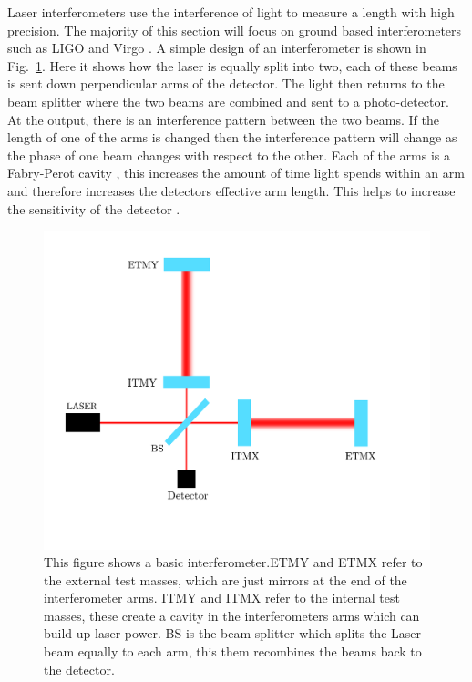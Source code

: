 Laser interferometers use the interference of light to measure a length with high precision.
The majority of this section will focus on ground based interferometers such as \ac{LIGO} and Virgo \citep{aasi2015AdvancedLIGO,acernese2015AdvancedVirgo}.
A simple design of an interferometer is shown in Fig.~\ref{detectors:interferometer}. 
Here it shows how the laser is equally split into two, each of these beams is sent down perpendicular arms of the detector. 
The light then returns to the beam splitter where the two beams are combined and sent to a photo-detector.
At the output, there is an interference pattern between the two beams.
If the length of one of the arms is changed then the interference pattern will change as the phase of one beam changes with respect to the other.
Each of the arms is a Fabry-Perot cavity \citep{}, this increases the amount of time light spends within an arm and therefore increases the detectors effective arm length. This helps to increase the sensitivity of the detector .
\begin{figure}[h]
    \centering
    \includegraphics[width=\textwidth]{C1_intro/interferometer.pdf}
    \caption{This figure shows a basic interferometer.ETMY and ETMX refer to the external test masses, which are just mirrors at the end of the interferometer arms. ITMY and ITMX refer to the internal test masses, these create a cavity in the interferometers arms which can build up laser power. BS is the beam splitter which splits the Laser beam equally to each arm, this them recombines the beams back to the detector.}
    \label{detectors:interferometer}
\end{figure}

